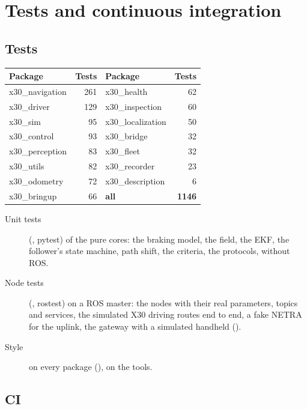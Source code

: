 \chapter{Tests and continuous integration}
\label{ch:a-quality}

\section{Tests}

\begin{center}
\begin{small}
\begin{tabular}{@{}lr@{\qquad}lr@{}}
  \toprule
  \textbf{Package} & \textbf{Tests} & \textbf{Package} & \textbf{Tests} \\
  \midrule
  x30\_navigation & 261 & x30\_health & 62 \\
  x30\_driver & 129 & x30\_inspection & 60 \\
  x30\_sim & 95 & x30\_localization & 50 \\
  x30\_control & 93 & x30\_bridge & 32 \\
  x30\_perception & 83 & x30\_fleet & 32 \\
  x30\_utils & 82 & x30\_recorder & 23 \\
  x30\_odometry & 72 & x30\_description & 6 \\
  x30\_bringup & 66 & \textbf{all} & \textbf{1146} \\
  \bottomrule
\end{tabular}
\end{small}
\end{center}

\begin{description}
  \item[Unit tests] (, pytest) of the pure cores: the braking model, the field, the
    EKF, the follower's state machine, path shift, the criteria, the protocols, without ROS.
  \item[Node tests] (, rostest) on a ROS master: the nodes with their real
    parameters, topics and services, the simulated X30 driving routes end to end, a fake NETRA for
    the uplink, the gateway with a simulated handheld ().
  \item[Style]  on every package (),  on the tools.
\end{description}

\section{CI}

